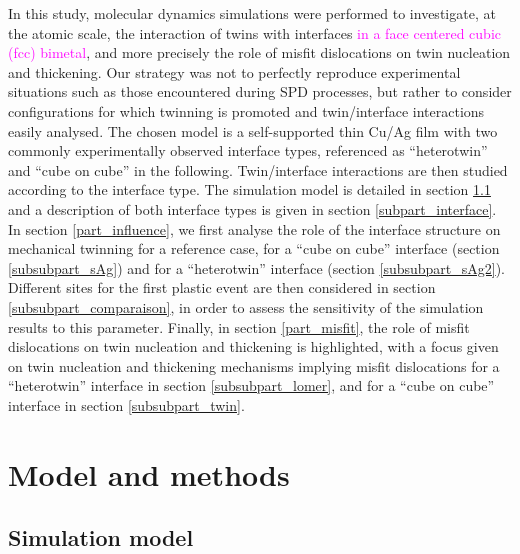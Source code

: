 \documentclass[final,3p,times,twocolumn]{elsarticle}
\begin{document}
In this study, molecular dynamics simulations were performed to investigate, at the atomic scale, the interaction of twins with interfaces \textcolor{magenta}{in a face centered cubic (fcc) bimetal}, and more precisely the role of misfit dislocations on twin nucleation and thickening. 
Our strategy was not to perfectly reproduce experimental situations such as those encountered during SPD processes,
but rather to consider configurations for which twinning is promoted and twin/interface interactions easily analysed. The chosen model is a self-supported thin Cu/Ag film with two commonly experimentally observed interface types, referenced as “heterotwin” and “cube on cube” in the following. Twin/interface interactions are then studied according to the interface type. The simulation model is detailed in section \ref{subpart_model} and a description of both interface types is given in section \ref{subpart_interface}. In section \ref{part_influence}, we first analyse the role of the interface structure on mechanical twinning for a reference case, for a “cube on cube” interface (section \ref{subsubpart_sAg}) and for a “heterotwin” interface (section \ref{subsubpart_sAg2}). Different sites for the first plastic event are then considered in section \ref{subsubpart_comparaison}, in order to assess the sensitivity of the simulation results to this parameter. Finally, in section \ref{part_misfit}, the role of misfit dislocations on twin nucleation and thickening is highlighted, with a focus given on twin nucleation and thickening mechanisms implying misfit dislocations for a “heterotwin” interface in section \ref{subsubpart_lomer}, and for a “cube on cube” interface in section \ref{subsubpart_twin}.         

\section{Model and methods}
\label{part_methods}

	\subsection{Simulation model}
	\label{subpart_model}
	
\end{document}
